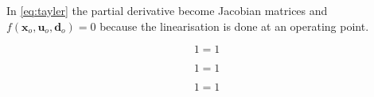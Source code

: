 In \cref{eq:tayler} the partial derivative become Jacobian matrices and $f(\textbf{x}_o, \textbf{u}_o, \textbf{d}_o) = 0$ because the linearisation is done at an operating point.

\begin{equation} \label{eq:}
	1=1
\end{equation}

\begin{equation} \label{eq:}
	1=1
\end{equation}

\begin{equation} \label{eq:}
	1=1
\end{equation}